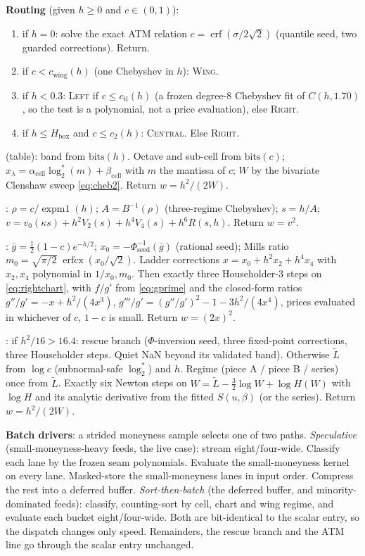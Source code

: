 \documentclass[11pt]{article}
\newcommand{\erf}{\operatorname{erf}}
\newcommand{\erfcx}{\operatorname{erfcx}}
\newcommand{\PhiN}{\Phi}
\newcommand{\expmone}{\operatorname{expm1}}
\newcommand{\rtag}[1]{{\normalfont\scshape #1}}
\begin{document}
\medskip\noindent\textbf{Routing} (given $h\ge0$ and $c\in(0,1)$):
\begin{enumerate}[leftmargin=2em,itemsep=1pt]
\item if $h=0$: solve the exact ATM relation $c=\erf(\sigma/2\sqrt2)$ (quantile seed, two guarded corrections). Return. \item if $c<c_{\mathrm{wing}}(h)$ (one Chebyshev in $h$): \textsc{Wing}. \item if $h<0.3$: \textsc{Left} if $c\le c_{\mathrm{tl}}(h)$ (a frozen degree-$8$ Chebyshev fit of $C(h,1.70)$, so the test is a polynomial, not a price evaluation), else \textsc{Right}. \item if $h\le H_{\mathrm{box}}$ and $c\le c_2(h)$: \textsc{Central}. Else \textsc{Right}.
\end{enumerate}

\medskip\noindent\rtag{Central} (table): band from $\mathrm{bits}(h)$. Octave and sub-cell from $\mathrm{bits}(c)$; $x_\lambda=\alpha_{\mathrm{cell}}\log_2^{*}(m)+\beta_{\mathrm{cell}}$ with $m$ the mantissa of $c$; $W$ by the bivariate Clenshaw sweep \eqref{eq:cheb2}. Return $w=h^2/(2W)$.

\medskip\noindent\rtag{Left}: $\rho=c/\expmone(h)$; $A=B^{-1}(\rho)$ (three-regime Chebyshev); $s=h/A$; $v=v_0(\kappa s)+h^2V_2(s)+h^4V_4(s)+h^6R(s,h)$. Return $w=v^2$.

\medskip\noindent\rtag{Right}: $\bar g=\tfrac12(1-c)e^{-h/2}$; $x_0=-\Phi^{-1}_{\mathrm{seed}}(\bar g)$ (rational seed); Mills ratio $m_0=\sqrt{\pi/2}\;\erfcx(x_0/\sqrt2)$. Ladder corrections $x=x_0+h^2x_2+h^4x_4$ with $x_2,x_4$ polynomial in $1/x_0,m_0$. Then exactly three Householder-3 steps on \eqref{eq:rightchart}, with $f/g'$ from \eqref{eq:gprime} and the closed-form ratios $g''/g'=-x+h^2/(4x^3)$, $g'''/g'=(g''/g')^2-1-3h^2/(4x^4)$, prices evaluated in whichever of $c$, $1-c$ is small. Return $w=(2x)^2$.

\medskip\noindent\rtag{Wing}: if $h^2/16>16.4$: rescue branch ($\PhiN$-inversion seed, three fixed-point corrections, three Householder steps. Quiet NaN beyond its validated band). Otherwise $\widetilde L$ from $\log c$ (subnormal-safe $\log_2^{*}$) and $h$. Regime (piece A / piece B / series) once from $\widetilde L$. Exactly six Newton steps on $W=\widetilde L-\tfrac32\log W+\log H(W)$ with $\log H$ and its analytic derivative from the fitted $S(u,\beta)$ (or the series). Return $w=h^2/(2W)$.

\medskip\noindent\textbf{Batch drivers}: a strided moneyness sample selects one of two paths. \emph{Speculative} (small-moneyness-heavy feeds, the live case): stream eight/four-wide. Classify each lane by the frozen seam polynomials. Evaluate the small-moneyness kernel on every lane. Masked-store the small-moneyness lanes in input order. Compress the rest into a deferred buffer. \emph{Sort-then-batch} (the deferred buffer, and minority-dominated feeds): classify, counting-sort by cell, chart and wing regime, and evaluate each bucket eight/four-wide. Both are bit-identical to the scalar entry, so the dispatch changes only speed. Remainders, the rescue branch and the ATM line go through the scalar entry unchanged.
\end{document}
